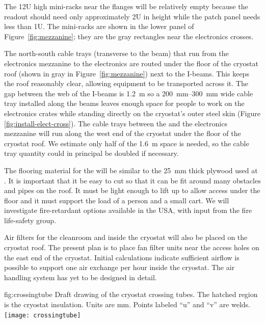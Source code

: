 The 12U high mini-racks near the \fdth flanges will be relatively empty because the  readout should need only approximately 2U in height while the  patch panel needs less than 1U. The mini-racks are shown in the lower panel of Figure~\ref{fig:mezzanine}; 
they are the gray rectangles near the electronics crosses.

The north-south cable trays (transverse to the beam) that run from the electronics mezzanine to the electronics \fdth are routed under the floor of the cryostat roof (shown in gray in Figure~\ref{fig:mezzanine}) next to the 
I-beams. 
This keeps the roof reasonably clear, allowing equipment to be transported across it. 
The gap between the web of the I-beams is \SI{1.2}{m} so 
a \SIrange{200}{300}{mm} wide cable tray installed along the beams 
leaves enough space for people to work on the electronics crates while standing directly on the cryostat's outer steel skin (Figure \ref{fig:install-elect-cross}). 
The cable trays between the  and the electronics mezzanine will run along the west end of the cryostat under the floor of the cryostat roof. 
We estimate only half of the \SI{1.6}{m} space is needed, so the cable tray quantity could in principal be doubled if necessary. 

The flooring material for the 
will be similar to the \SI{25}{mm} thick plywood used at . 
It is important that it be easy to cut so that it can be fit around many obstacles and pipes on the roof. It must be light enough to lift up to allow access under the floor and it must support the load of a person and a small cart. 
We will investigate fire-retardant options available in the USA, with input from the  fire life-safety group. 

Air filters for the cleanroom and inside the cryostat will also be placed on the cryostat roof. The present plan is to place fan filter units near the %
access holes on the east end of the cryostat. Initial calculations indicate sufficient airflow is possible to support one air exchange per hour inside the cryostat. The air handling system has yet to be designed in detail.


\begin{dunefigure}{fig:crossingtube}
  {Draft drawing of the cryostat crossing tubes. The hatched region is the cryostat insulation. Units are mm. Points labeled ``u'' and ``v'' are welds. }
\texttt{[image: crossingtube]}
\end{dunefigure}
 
